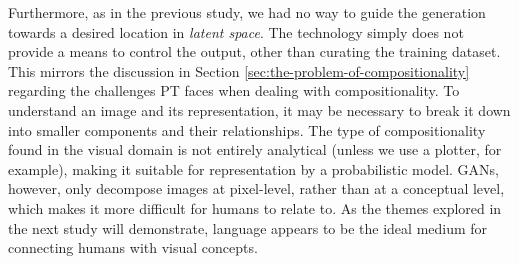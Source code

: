 Furthermore, as in the previous study, we had no way to guide the generation towards a desired location in \emph{latent space}. The technology simply does not provide a means to control the output, other than curating the training dataset. This mirrors the discussion in Section \ref{sec:the-problem-of-compositionality} regarding the challenges PT faces when dealing with compositionality. To understand an image and its representation, it may be necessary to break it down into smaller components and their relationships. The type of compositionality found in the visual domain is not entirely analytical (unless we use a plotter, for example), making it suitable for representation by a probabilistic model. GANs, however, only decompose images at pixel-level, rather than at a conceptual level, which makes it more difficult for humans to relate to. As the themes explored in the next study will demonstrate, language appears to be the ideal medium for connecting humans with visual concepts.

